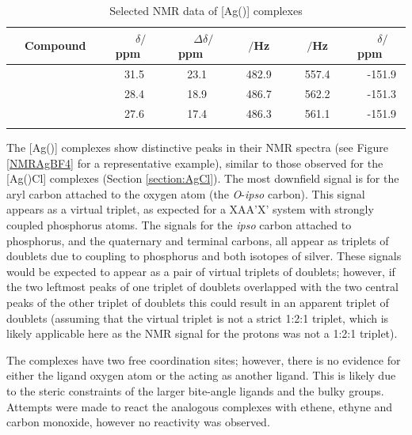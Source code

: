 \begin{table}[h]
\caption[Selected NMR data of [Ag(\tBuxantphos){]} complexes]{Selected NMR data of [Ag(\tBuxantphos){]} complexes} 
\vspace{1em}
\label{table:silverBF4}
\small
\begin{center}
\begin{tabular}{l c c c c c}
	\toprule{}
	~~\bfseries{Compound}~~&~~\bfseries{$\delta$\phosphorus{}$/$ppm}~~&~~\bfseries{$\Delta\delta/$ ppm}~~&~~\bfseries{\JAgPseven{}$/$Hz}~~&~~\bfseries{\JAgPnine{}$/$Hz}~~&~~\bfseries{$\delta$\fluorine{}$/$ppm}~~\\
	\midrule
	~\tBuSixantphos 	&~~31.5~~&~~23.1~~&~~482.9~~&~~557.4~~&~~-151.9\\ 
	~\tBuThixantphos	&~~28.4~~&~~18.9~~&~~486.7~~&~~562.2~~&~~-151.3\\
	~\tBuXantphos		&~~27.6~~&~~17.4~~&~~486.3~~&~~561.1~~&~~-151.9\\
	\bottomrule{}
\end{tabular}
\end{center}
\end{table}

The [Ag(\tBuxantphos)] complexes show distinctive peaks in their \carbon{} NMR spectra (see Figure \ref{NMRAgBF4} for a representative example), similar to those observed for the [Ag(\tBuxantphos)Cl] complexes (Section \ref{section:AgCl}).  The most downfield signal is for the aryl carbon attached to the oxygen atom (the \emph{O}-\emph{ipso} carbon).  This signal appears as a virtual triplet, as expected for a XAA'X' system with strongly coupled phosphorus atoms.  The signals for the \emph{ipso} carbon attached to phosphorus, and the \tBu{} quaternary and terminal carbons, all appear as triplets of doublets due to coupling to phosphorus and both isotopes of silver.  These signals would be expected to appear as a pair of virtual triplets of doublets; however, if the two leftmost peaks of one triplet of doublets overlapped with the two central peaks of the other triplet of doublets this could result in an apparent triplet of doublets (assuming that the virtual triplet is not a strict 1:2:1 triplet, which is likely applicable here as the \proton{} NMR signal for the \tBu{} protons was not a 1:2:1 triplet).

The  complexes have two free coordination sites; however, there is no evidence for either the ligand oxygen atom or the  acting as another ligand.  This is likely due to the steric constraints of the larger bite-angle ligands and the bulky \tBu{} groups.  Attempts were made to react the analogous  complexes with ethene, ethyne and carbon monoxide, however no reactivity was observed.


